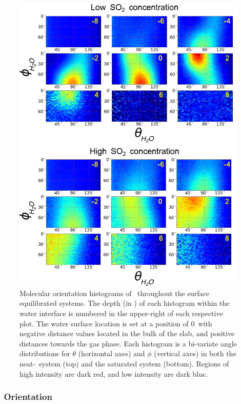 \documentclass{article}
\begin{document}
\begin{figure}[h!]
	\begin{center}
		\includegraphics[scale=1.0]{theta-phi-h2o.png}
		\caption{Molecular orientation histograms of \wat~throughout the surface equilibrated systems. The depth (in \angs) of each histogram within the water interface is numbered in the upper-right of each respective plot. The water surface location is set at a position of 0\angs~with negative distance values located in the bulk of the slab, and positive distances towards the gas phase. Each histogram is a bi-variate angle distributions for $\theta$ (horizontal axes) and $\phi$ (vertical axes) in both the neat-\wat~system (top) and the saturated system (bottom). Regions of high intensity are dark red, and low intensity are dark blue.}
		\label{fig:water-orientation}
	\end{center}
\end{figure}


\subsubsection{\suldiox~Orientation}
\end{document}
